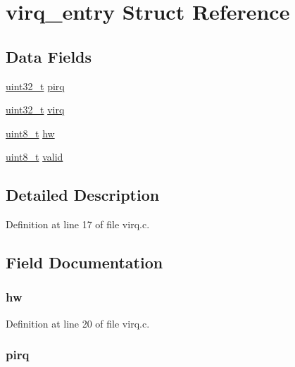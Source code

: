 \hypertarget{structvirq__entry}{\section{virq\-\_\-entry \-Struct \-Reference}
\label{structvirq__entry}
}
\subsection*{\-Data \-Fields}
\begin{DoxyCompactItemize}
\item 
\hyperlink{arch__types_8h_a435d1572bf3f880d55459d9805097f62}{uint32\-\_\-t} \hyperlink{structvirq__entry_a2a59c4afaefc59fc0b2bb37277e6293c}{pirq}
\item 
\hyperlink{arch__types_8h_a435d1572bf3f880d55459d9805097f62}{uint32\-\_\-t} \hyperlink{structvirq__entry_a76a7da8e942ab20e51e638d71b9735db}{virq}
\item 
\hyperlink{arch__types_8h_aba7bc1797add20fe3efdf37ced1182c5}{uint8\-\_\-t} \hyperlink{structvirq__entry_a13d8d32393f29395656ba69beb6e35ec}{hw}
\item 
\hyperlink{arch__types_8h_aba7bc1797add20fe3efdf37ced1182c5}{uint8\-\_\-t} \hyperlink{structvirq__entry_a75adb1881fa5da948723d7b8807b78cd}{valid}
\end{DoxyCompactItemize}


\subsection{\-Detailed \-Description}


\-Definition at line 17 of file virq.\-c.



\subsection{\-Field \-Documentation}
\hypertarget{structvirq__entry_a13d8d32393f29395656ba69beb6e35ec}{
\subsubsection[{hw}]{ {\bf hw}}}\label{structvirq__entry_a13d8d32393f29395656ba69beb6e35ec}


\-Definition at line 20 of file virq.\-c.

\hypertarget{structvirq__entry_a2a59c4afaefc59fc0b2bb37277e6293c}{
\subsubsection[{pirq}]{ {\bf pirq}}}\label{structvirq__entry_a2a59c4afaefc59fc0b2bb37277e6293c}


